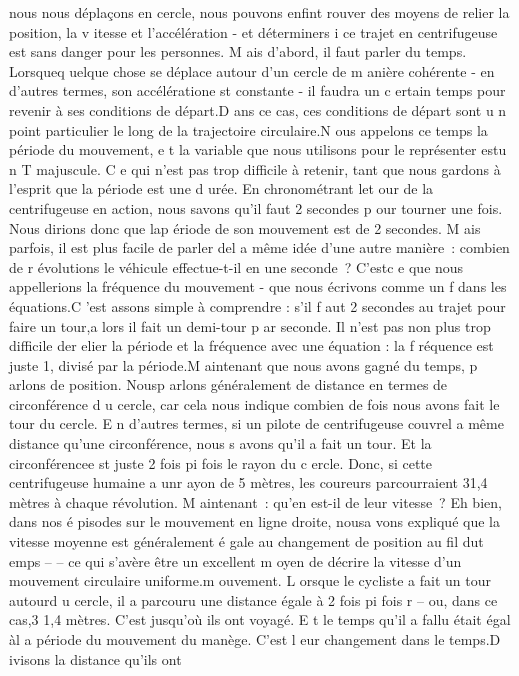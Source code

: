 nous nous déplaçons en cercle, nous pouvons enfint rouver des moyens de
relier la position, la v itesse et l'accélération - et déterminers i ce
trajet en centrifugeuse est sans danger pour les personnes. M ais
d'abord, il faut parler du temps. Lorsqueq uelque chose se déplace
autour d'un cercle de m anière cohérente - en d'autres termes, son
accélératione st constante - il faudra un c ertain temps pour revenir à
ses conditions de départ.D ans ce cas, ces conditions de départ sont u n
point particulier le long de la trajectoire circulaire.N ous appelons ce
temps la période du mouvement, e t la variable que nous utilisons pour
le représenter estu n T majuscule. C e qui n'est pas trop difficile à
retenir, tant que nous gardons à l'esprit que la période est une d urée.
En chronométrant let our de la centrifugeuse en action, nous savons
qu'il faut 2 secondes p our tourner une fois. Nous dirions donc que lap
ériode de son mouvement est de 2 secondes. M ais parfois, il est plus
facile de parler del a même idée d'une autre manière~: combien de r
évolutions le véhicule effectue-t-il en une seconde~? C'estc e que nous
appellerions la fréquence du mouvement - que nous écrivons comme un f
dans les équations.C 'est assons simple à comprendre : s'il f aut 2
secondes au trajet pour faire un tour,a lors il fait un demi-tour p ar
seconde. Il n'est pas non plus trop difficile der elier la période et la
fréquence avec une équation : la f réquence est juste 1, divisé par la
période.M aintenant que nous avons gagné du temps, p arlons de position.
Nousp arlons généralement de distance en termes de circonférence d u
cercle, car cela nous indique combien de fois nous avons fait le tour du
cercle. E n d'autres termes, si un pilote de centrifugeuse couvrel a
même distance qu'une circonférence, nous s avons qu'il a fait un tour.
Et la circonférencee st juste 2 fois pi fois le rayon du c ercle. Donc,
si cette centrifugeuse humaine a unr ayon de 5 mètres, les coureurs
parcourraient 31,4 mètres à chaque révolution. M aintenant~: qu'en
est-il de leur vitesse~? Eh bien, dans nos é pisodes sur le mouvement en
ligne droite, nousa vons expliqué que la vitesse moyenne est
généralement é gale au changement de position au fil dut emps -- -- ce
qui s'avère être un excellent m oyen de décrire la vitesse d'un
mouvement circulaire uniforme.m ouvement. L orsque le cycliste a fait un
tour autourd u cercle, il a parcouru une distance égale à 2 fois pi fois
r -- ou, dans ce cas,3 1,4 mètres. C'est jusqu'où ils ont voyagé. E t le
temps qu'il a fallu était égal àl a période du mouvement du manège.
C'est l eur changement dans le temps.D ivisons la distance qu'ils ont
